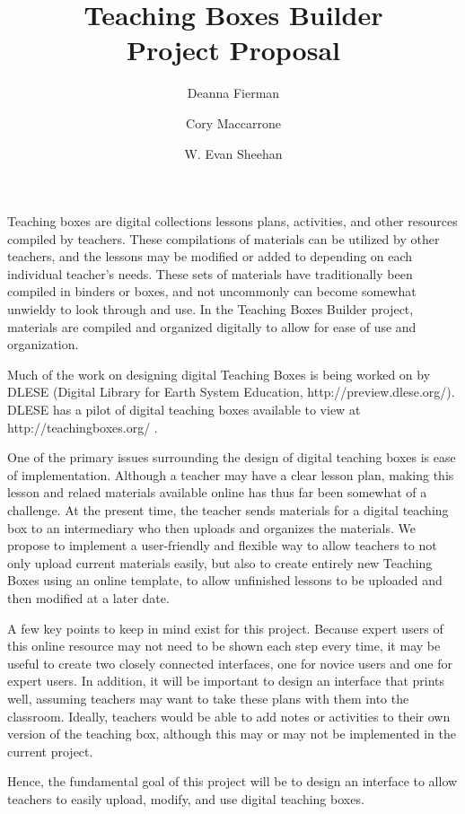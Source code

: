 \documentclass[11pt,letter]{article}
\title{Teaching Boxes Builder\\Project Proposal}
\author{Deanna Fierman \and Cory Maccarrone \and W. Evan Sheehan}
\begin{document}
\begin{titlepage}
	\maketitle
	\thispagestyle{empty}
\end{titlepage}
Teaching boxes are digital collections lessons plans, activities, and other
resources compiled by teachers. These compilations of materials can be utilized
by other teachers, and the lessons may be modified or added to depending on each
individual teacher's needs. These sets of materials have traditionally been
compiled in binders or boxes, and not uncommonly can become somewhat unwieldy to
look through and use.  In the Teaching Boxes Builder project, materials are
compiled and organized digitally to allow for ease of use and organization.

Much of the work on designing digital Teaching Boxes is being worked on by DLESE
(Digital Library for Earth System Education, http://preview.dlese.org/).  DLESE
has a pilot of digital teaching boxes available to view at
http://teachingboxes.org/ .

One of the primary issues surrounding the design of digital teaching boxes is
ease of implementation.  Although a teacher may have a clear lesson plan, making
this lesson and relaed materials available online has thus far been somewhat of
a challenge.  At the present time, the teacher sends materials for a digital
teaching box to an intermediary who then uploads and organizes the materials.
We propose to implement a user-friendly and flexible way to allow teachers to
not only upload current materials easily, but also to create entirely new
Teaching Boxes using an online template, to allow unfinished lessons to be
uploaded and then modified at a later date.

A few key points to keep in mind exist for this project.  Because expert users
of this online resource may not need to be shown each step every time, it may be
useful to create two closely connected interfaces, one for novice users and one
for expert users. In addition, it will be important to design an interface that
prints well, assuming teachers may want to take these plans with them into the
classroom.  Ideally, teachers would be able to add notes or activities to their
own version of the teaching box, although this may or may not be implemented in
the current project.

Hence, the fundamental goal of this project will be to design an interface to
allow teachers to easily upload, modify, and use digital teaching boxes.
\end{document}
